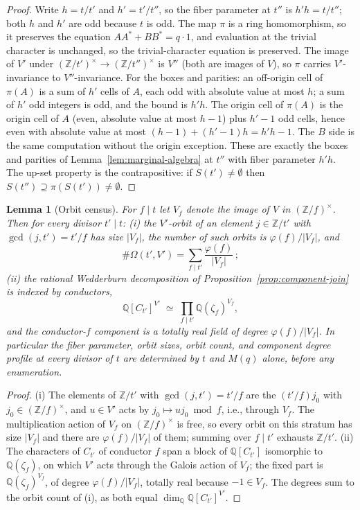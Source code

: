 \documentclass[11pt]{article}
\theoremstyle{plain}
\newtheorem{lemma}[theorem]{Lemma}
\theoremstyle{definition}
\theoremstyle{remark}
\newcommand{\Z}{\mathbb Z}
\newcommand{\Q}{\mathbb Q}
\begin{document}
\begin{proof}
Write $h=t/t'$ and $h'=t'/t''$, so the fiber parameter at $t''$ is
$h'h=t/t''$; both $h$ and $h'$ are odd because $t$ is odd.  The map $\pi$ is
a ring homomorphism, so it preserves the equation $AA^*+BB^*=q\cdot1$, and
evaluation at the trivial character is unchanged, so the trivial-character
equation is preserved.  The image of $V'$ under
$(\Z/t')^\times\to(\Z/t'')^\times$ is $V''$ (both are images of $V$), so
$\pi$ carries $V'$-invariance to $V''$-invariance.  For the boxes and
parities: an off-origin cell of $\pi(A)$ is a sum of $h'$ cells of $A$, each
odd with absolute value at most $h$; a sum of $h'$ odd integers is odd, and
the bound is $h'h$.  The origin cell of $\pi(A)$ is the origin cell of $A$
(even, absolute value at most $h-1$) plus $h'-1$ odd cells, hence even with
absolute value at most $(h-1)+(h'-1)h=h'h-1$.  The $B$ side is the same
computation without the origin exception.  These are exactly the boxes and
parities of Lemma~\ref{lem:marginal-algebra} at $t''$ with fiber parameter
$h'h$.  The up-set property is the contrapositive: if
$S(t')\ne\emptyset$ then $S(t'')\supseteq\pi(S(t'))\ne\emptyset$.
\end{proof}

\begin{lemma}[Orbit census]\label{lem:orbit-census}
For $f\mid t$ let $V_f$ denote the image of $V$ in $(\Z/f)^\times$.  Then for
every divisor $t'\mid t$:
\emph{(i)} the $V'$-orbit of an element $j\in\Z/t'$ with $\gcd(j,t')=t'/f$
has size $|V_f|$, the number of such orbits is $\varphi(f)/|V_f|$, and
\[
  \#\Omega(t',V')=\sum_{f\mid t'}\frac{\varphi(f)}{|V_f|}\,;
\]
\emph{(ii)} the rational Wedderburn decomposition of
Proposition~\ref{prop:component-join} is indexed by conductors,
\[
  \Q[C_{t'}]^{V'}\;\simeq\;\prod_{f\mid t'}\Q(\zeta_f)^{V_f},
\]
and the conductor-$f$ component is a totally real field of degree
$\varphi(f)/|V_f|$.
In particular the fiber parameter, orbit sizes, orbit count, and component
degree profile at every divisor of $t$ are determined by $t$ and $M(q)$
alone, before any enumeration.
\end{lemma}

\begin{proof}
(i) The elements of $\Z/t'$ with $\gcd(j,t')=t'/f$ are the $(t'/f)j_0$ with
$j_0\in(\Z/f)^\times$, and $u\in V'$ acts by $j_0\mapsto uj_0\bmod f$, i.e.,
through $V_f$.  The multiplication action of $V_f$ on $(\Z/f)^\times$ is
free, so every orbit on this stratum has size $|V_f|$ and there are
$\varphi(f)/|V_f|$ of them; summing over $f\mid t'$ exhausts $\Z/t'$.
(ii) The characters of $C_{t'}$ of conductor $f$ span a block of
$\Q[C_{t'}]$ isomorphic to $\Q(\zeta_f)$, on which $V'$ acts through the
Galois action of $V_f$; the fixed part is $\Q(\zeta_f)^{V_f}$, of degree
$\varphi(f)/|V_f|$, totally real because $-1\in V_f$.  The degrees sum to
the orbit count of (i), as both equal $\dim_\Q\Q[C_{t'}]^{V'}$.
\end{proof}
\end{document}
